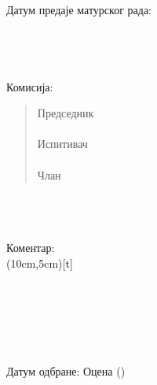 \documentclass[a4paper,14pt]{article}
\begin{document}
\newcommand{\linija}{\noindent\underline{\makebox[3cm][t]{}}}
\newcommand{\linijamala}{\noindent\underline{\makebox[1cm][t]{}}}
\newcommand{\komentar}{\framebox(10cm,5cm)[t]{}}
\newcommand{\poravnanje}{\makebox[5cm][t]{}}
\newcommand{\prazan}{\makebox[0cm][t]{}}

\prazan \\
Датум предаје матурског рада: \linija
\\\\\\\\\\
Комисија:
\begin{quote}
Председник \hfill \linija \poravnanje
\\\\
Испитивач \hfill \linija \poravnanje
\\\\
Члан \hfill \linija \poravnanje
\end{quote}
\prazan \\\\\\
Коментар: 
\\ \prazan \hfill \komentar
\\\\\\\\\\\\\\
Датум одбране: \linija \hfill Оцена \linija (\linijamala)
\end{document}
